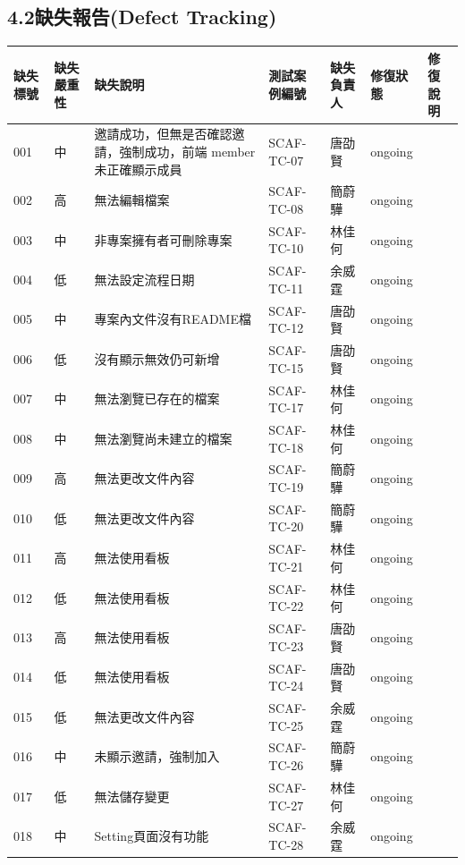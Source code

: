 \documentclass{report}
\begin{document}
\subsection*{4.2缺失報告(Defect Tracking)}
\begin{tabularx}{\textwidth}{ 
  |p{}%
  |p{}%
  |p{}%
  |p{}%
  |p{}%
  |p{}%
  |p{}|%
}
  \hline
  缺失標號 & 缺失嚴重性 & 缺失說明 & 測試案例編號 & 缺失負責人 & 修復狀態 & 修復說明\\
  \hline
  001 & 中 & 邀請成功，但無是否確認邀請，強制成功，前端 member 未正確顯示成員 & SCAF-TC-07 & 唐劭賢 &ongoing & \\
  \hline
  002 & 高 & 無法編輯檔案 & SCAF-TC-08 & 簡蔚驊 & ongoing & \\
  \hline
  003 & 中 & 非專案擁有者可刪除專案 & SCAF-TC-10 & 林佳何 & ongoing &  \\
  \hline
  004 & 低 & 無法設定流程日期 & SCAF-TC-11 & 余威霆 & ongoing & \\
  \hline
  005 & 中 & 專案內文件沒有README檔 & SCAF-TC-12 & 唐劭賢 & ongoing & \\
  \hline
  006 & 低 & 沒有顯示無效仍可新增 & SCAF-TC-15 & 唐劭賢 & ongoing & \\
  \hline
  007 & 中 & 無法瀏覽已存在的檔案 & SCAF-TC-17 & 林佳何 & ongoing & \\
  \hline
  008 & 中 & 無法瀏覽尚未建立的檔案 & SCAF-TC-18 & 林佳何 & ongoing & \\
  \hline
  009 & 高 & 無法更改文件內容 & SCAF-TC-19 & 簡蔚驊 & ongoing  & \\
  \hline
  010 & 低 & 無法更改文件內容 & SCAF-TC-20 & 簡蔚驊 & ongoing & \\
  \hline
  011 & 高 & 無法使用看板 & SCAF-TC-21 & 林佳何 & ongoing & \\
  \hline
  012 & 低 & 無法使用看板 & SCAF-TC-22 & 林佳何 & ongoing & \\
  \hline
  013 & 高 & 無法使用看板 & SCAF-TC-23 & 唐劭賢 & ongoing & \\
  \hline
  014 & 低 & 無法使用看板 & SCAF-TC-24 & 唐劭賢 & ongoing & \\
  \hline
  015 & 低 & 無法更改文件內容 & SCAF-TC-25 & 余威霆 & ongoing & \\
  \hline
  016 & 中 & 未顯示邀請，強制加入 & SCAF-TC-26 & 簡蔚驊 & ongoing & \\
  \hline
  017 & 低 & 無法儲存變更 & SCAF-TC-27 & 林佳何 & ongoing & \\
  \hline
  018 & 中 & Setting頁面沒有功能 & SCAF-TC-28 & 余威霆 & ongoing & \\
  \hline
\end{tabularx}
\end{document}

